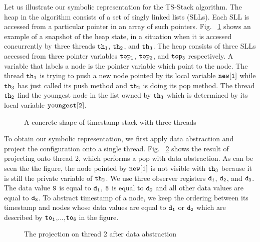 Let us illustrate our symbolic representation for the TS-Stack algorithm.
The heap in the algorithm consists of a set of singly linked lists (SLLs). Each
SLL is accessed from a particular pointer in an array of such pointers. 
Fig. ~\ref{fig:tsshape} shows an example of a snapshot of the heap state, in a situation when
it is accessed concurrently by three threads ${\tt th}_1$, ${\tt th}_2$, and ${\tt th}_3$. The heap consists of three SLLs accessed from three pointer variables $\tt top_1$, $\tt top_2$, and $\tt top_3$ respectively. A variable that labels a node is the pointer variable which point to the node.
The thread ${\tt th}_1$ is trying to push a new node pointed by its local variable $\tt new[1]$ while ${\tt th}_3$ has just called its push method and ${\tt th}_2$ is doing its pop method. The thread ${\tt th}_2$ find the youngest node in the list owned by ${\tt th}_3$ which is determined by its local variable $\tt youngest[2]$.
\begin{figure}
	
\caption{A concrete shape of timestamp stack with three threads}
\label{fig:tsshape}
\end{figure} 
To obtain our symbolic representation, we first apply data abstraction and
project the configuration onto a single thread. Fig. ~\ref{fig:tsdabsshape} shows the result
of projecting onto thread 2, which performs a pop with data abstraction.
As can be seen the the figure, the node pointed by $\tt new[1]$ is not visible with ${\tt th}_3$ because it is still the private variable of ${\tt th}_2$. We use three observer registers $\tt d_1$, $\tt d_2$, and $\tt d_3$. The data value $\tt 9$ is equal to $\tt d_1$, $\tt 8$ is equal to $\tt d_2$ and all other data values are equal to $\tt d_3$. To abstract timestamp of a node, we keep the ordering between its timestamp and nodes whose data values are equal to $\tt d_1$ or $\tt d_2$ which are described by $\tt to_1$,...,$\tt to_6$ in the figure.
\begin{figure}
	
\caption{The projection on thread 2 after data abstraction}
\label{fig:tsdabsshape}
\end{figure} 

